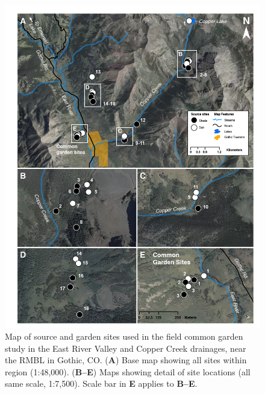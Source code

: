 \documentclass[11pt, oneside]{amsart}
\begin{document}
\begin{figure}[!htbp]
\centering
\includegraphics[scale=0.6]{mapsmv2}
\caption{Map of source and garden sites used in the field common garden study in the East River Valley and Copper Creek drainages, near the RMBL in Gothic, CO. (\textbf{A}) Base map showing all sites within region (1:48,000). (\textbf{B--E}) Maps showing detail of site locations (all same scale, 1:7,500). Scale bar in \textbf{E} applies to \textbf{B--E}.}
\label{map}
\end{figure}

\newpage
\end{document}
